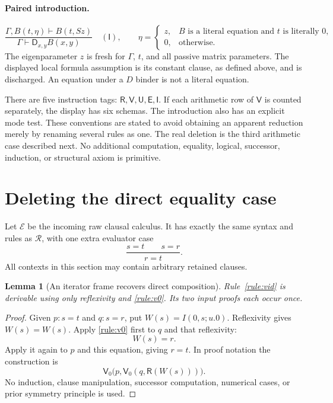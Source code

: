 \documentclass[11pt]{article}
\newtheorem{lemma}[theorem]{Lemma}
\theoremstyle{definition}
\newcommand{\Raw}{\mathcal R}
\newcommand{\Old}{\mathcal E}
\newcommand{\D}{\mathsf D}
\newcommand{\Use}{\mathsf U}
\newcommand{\Refl}{\mathsf R}
\newcommand{\Eval}{\mathsf V}
\begin{document}
\paragraph{Paired introduction.}
\[
 \frac{\Gamma,B(t,\eta)\vdash B(t,Sz)}
      {\Gamma\vdash\D_{x,y}B(x,y)}\quad(\mathsf I),
 \qquad
 \eta=\begin{cases}
 z,&B\text{ is a literal equation and }t\text{ is literally }0,\\
 0,&\text{otherwise}.
 \end{cases}
\tag{I}\label{rule:i}
\]
The eigenparameter $z$ is fresh for $\Gamma$, $t$, and all passive matrix
parameters. The displayed local formula assumption is its constant clause,
as defined above, and is discharged. An equation under a $D$ binder is not
a literal equation.

There are five instruction tags: $\Refl,\Eval,\Use,\mathsf E,\mathsf I$.
If each arithmetic row of $\Eval$ is counted separately, the display has
six schemas. The introduction also has an explicit mode test. These
conventions are stated to avoid obtaining an apparent reduction merely by
renaming several rules as one. The real deletion is the third arithmetic
case described next. No additional computation, equality, logical,
successor, induction, or structural axiom is primitive.

\section{Deleting the direct equality case}
\label{sec:deletion}

Let $\Old$ be the incoming raw clausal calculus. It has exactly the same
syntax and rules as $\Raw$, with one extra evaluator case
\[
       \frac{s=t\qquad s=r}{r=t}.\tag{VId}\label{rule:vid}
\]
All contexts in this section may contain arbitrary retained clauses.

\begin{lemma}[An iterator frame recovers direct composition]
\label{lem:frame}
Rule~\eqref{rule:vid} is derivable using only reflexivity and
\eqref{rule:v0}. Its two input proofs each occur once.
\end{lemma}
\begin{proof}
Given $p:s=t$ and $q:s=r$, put $W(s)=I(0,s;u.0)$. Reflexivity gives
$W(s)=W(s)$. Apply \eqref{rule:v0} first to $q$ and that reflexivity:
\[
                     W(s)=r.
\]
Apply it again to $p$ and this equation, giving $r=t$.
In proof notation the construction is
\[
         \Eval_0\bigl(p,\Eval_0(q,\Refl(W(s)))\bigr).
\]
No induction, clause manipulation, successor computation, numerical cases,
or prior symmetry principle is used.
\end{proof}
\end{document}
